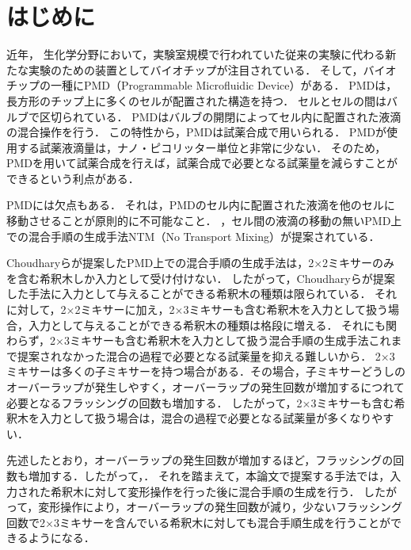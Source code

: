 \chapter{はじめに}
近年， 生化学分野において，実験室規模で行われていた従来の実験に代わる新たな実験のための装置としてバイオチップが注目されている．
そして，バイオチップの一種にPMD（Programmable Microfluidic Device）がある\cite{PMDDescription}．
PMDは，長方形のチップ上に多くのセルが配置された構造を持つ．
セルとセルの間はバルブで区切られている．
PMDはバルブの開閉によってセル内に配置された液滴の混合操作を行う．
この特性から，PMDは試薬合成で用いられる\cite{C0LC00537A}．
PMDが使用する試薬液滴量は，ナノ・ピコリッター単位と非常に少ない．
そのため，PMDを用いて試薬合成を行えば，試薬合成で必要となる試薬量を減らすことができるという利点がある\cite{PMDDescription}．

PMDには欠点もある．
それは，PMDのセル内に配置された液滴を他のセルに移動させることが原則的に不可能なこと\cite{9116370}．
，セル間の液滴の移動{の無いPMD上での混合手順の生成手法}NTM（No Transport Mixing）が提案されている\cite{9116370}．

Choudharyらが提案したPMD上での混合手順の生成手法は，2×2ミキサーのみを含む希釈木しか入力として受け付けない．
したがって，Choudharyらが提案した手法に入力として与えることができる希釈木の種類は限られている．
それに対して，2×2ミキサーに加え，2×3ミキサーも含む希釈木を入力として扱う場合，入力として与えることができる希釈木の種類は格段に増える．
それにも関わらず，2×3ミキサーも含む希釈木を入力として扱う混合手順の生成手法これまで提案されなかった混合の過程で必要となる試薬量を抑える難しいから．
2×3ミキサーは多くの子ミキサーを持つ場合がある．その場合，子ミキサーどうしのオーバーラップが発生しやすく，オーバーラップの発生回数が増加するにつれて必要となるフラッシングの回数も増加する．
したがって，2×3ミキサーも含む希釈木を入力として扱う場合は，混合の過程で必要となる試薬量が多くなりやすい．

先述したとおり，オーバーラップの発生回数が増加するほど，フラッシングの回数も増加する．したがって，．
それを踏まえて，本論文で提案する手法では，入力された希釈木に対して変形操作を行った後に混合手順の生成を行う．
したがって，変形操作により，オーバーラップの発生回数が減り，少ないフラッシング回数で2×3ミキサーを含んでいる希釈木に対しても混合手順生成を行うことができるようになる．

